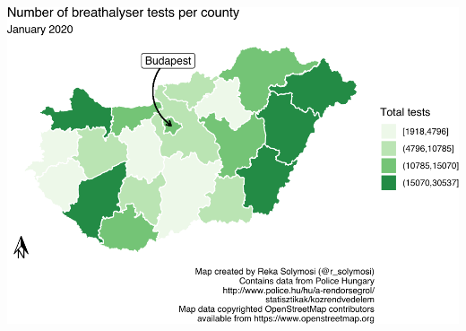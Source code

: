 \documentclass[
]{book}
\begin{document}
\includegraphics{crime_mapping_files/figure-latex/orientation-1.pdf}
\end{document}
